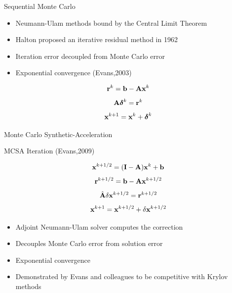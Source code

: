 \documentclass{beamer}
\begin{document}
\begin{frame}{Sequential Monte Carlo}

  \begin{itemize}
  \item Neumann-Ulam methods bound by the Central Limit Theorem
  \item Halton proposed an iterative residual method in 1962
  \item Iteration error decoupled from Monte Carlo error
  \item Exponential convergence (Evans,2003)
  \end{itemize}

  \[
  \mathbf{r}^k = \mathbf{b} - \mathbf{A}\mathbf{x}^k
  \]
  \[
  \mathbf{A}\boldsymbol{\delta}^{k} = \mathbf{r}^{k}
  \]
  \[
  \mathbf{x}^{k+1} = \mathbf{x}^k + \boldsymbol{\delta}^{k}
  \]

\end{frame}

\begin{frame}{Monte Carlo Synthetic-Acceleration}

  \begin{beamerboxesrounded}[upper=boxheadcolor,lower=boxbodycolor,shadow=true]
    {MCSA Iteration (Evans,2009)}

    \[
    \mathbf{x}^{k+1/2} = (\mathbf{I} - \mathbf{A})\mathbf{x}^k + \mathbf{b}
    \]
    \[
    \mathbf{r}^{k+1/2} = \mathbf{b} - \mathbf{A}\mathbf{x}^{k+1/2}
    \]
    \[
    \hat{\mathbf{A}}\delta\mathbf{x}^{k+1/2} = \mathbf{r}^{k+1/2}
    \]
    \[
    \mathbf{x}^{k+1} = \mathbf{x}^{k+1/2} + \delta \mathbf{x}^{k+1/2}
    \]

  \end{beamerboxesrounded}

  \begin{itemize}
  \item Adjoint Neumann-Ulam solver computes the correction
  \item Decouples Monte Carlo error from solution error
  \item Exponential convergence
  \item Demonstrated by Evans and colleagues to be competitive with
    Krylov methods
  \end{itemize}

\end{frame}
\end{document}
